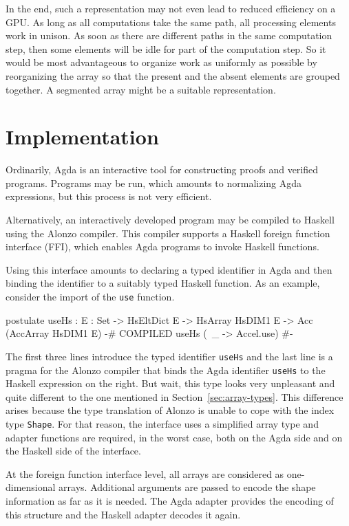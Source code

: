 \documentclass{llncs}
\begin{document}
In the end, such a representation may not even lead to reduced efficiency on a GPU. As long
as all computations take the same path, all processing elements work
in unison. As soon as there are different paths in the same
computation step, then some elements will be idle for part of the
computation step. So it would be most advantageous to organize work as
uniformly as possible by reorganizing the array so that the present
and the absent elements are grouped together. A segmented array might
be a suitable representation.


\section{Implementation}
\label{sec:implementation}

Ordinarily, Agda is an interactive tool for constructing proofs and
verified programs. Programs may be run, which amounts to normalizing
Agda expressions, but this process is not very efficient.

Alternatively, an interactively developed program may be compiled to
Haskell using the Alonzo compiler. This compiler supports a Haskell
foreign function interface (FFI), which enables Agda programs to invoke
Haskell functions. 

Using this interface amounts to declaring a typed identifier in Agda
and then binding the identifier to a suitably typed Haskell
function. As an example, consider the import of the \texttt{use}
function.
\begin{code}
postulate 
  useHs : {E : Set}
      -> HsEltDict E -> HsArray HsDIM1 E -> Acc (AccArray HsDIM1 E)
  {-# COMPILED useHs       (\ _ -> Accel.use) #-}
\end{code}
The first three lines introduce the typed identifier \texttt{useHs}
and the last line is a pragma for the Alonzo compiler that binds the
Agda identifier \texttt{useHs} to the Haskell expression on the right.
But wait, this type looks very unpleasant and quite different to the
one mentioned in Section~\ref{sec:array-types}. This difference arises
because the type translation of Alonzo is unable to cope with the
index type \texttt{Shape}. For that reason, the interface uses a
simplified array type and adapter functions are required, in the worst
case, both on the Agda side and on the Haskell side of the interface.

At the foreign function interface level, all arrays are considered as
one-dimensional arrays. Additional arguments are passed to encode the
shape information as far as it is needed. The Agda adapter provides
the encoding of this structure and the Haskell adapter decodes it again. 
\end{document}
